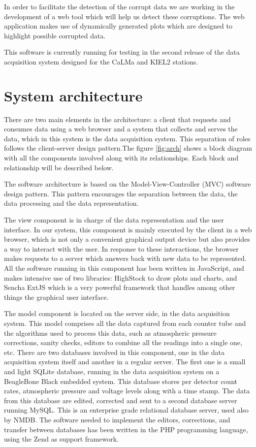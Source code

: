 \documentclass[a4paper]{jpconf}
\begin{document}
In order to facilitate the detection of the corrupt data we are working in the
development of a web tool which will help us detect these corruptions. The web
application makes use of dynamically generated plots which are designed to
highlight possible corrupted data.

This software is currently running for testing in the second release of the data
acquisition system\cite{Garcia2014} designed for the CaLMa\cite{Medina2013} and
KIEL2 stations.


\section{System architecture}

There are two main elements in the architecture: a client that requests and
consumes data using a web browser and a system that collects and serves the
data, which in this system is the data acquisition system. This separation of
roles follows the client-server design pattern\cite{wiki:ClientServer}.The
figure \ref{fig:arch} shows a block diagram with all the components involved
along with its relationships. Each block and relationship will be described
below.

The software architecture is based on the Model-View-Controller (MVC) software
design pattern\cite{wiki:MVC}. This pattern encourages the separation between
the data, the data processing and the data representation. 

The view component is in charge of the data representation and the user
interface. In our system, this component is mainly executed by the client in a
web browser, which is not only a convenient graphical output device but also
provides a way to interact with the user. In response to these interactions, the
browser makes requests to a server which answers back with new data to be
represented. All the software running in this component has been written in
JavaScript, and makes intensive use of two libraries:
HighStock\cite{web:highstock} to draw plots and charts, and Sencha
ExtJS\cite{web:extjs} which is a very powerful framework that handles among
other things the graphical user interface.

The model component is located on the server side, in the data acquisition
system. This model comprises all the data captured from each counter tube and
the algorithms used to process this data, such as atmospheric pressure
corrections, sanity checks, editors to combine all the readings into a single
one, etc. There are two databases involved in this component, one in the data
acquisition system itself and another in a regular server. The first one is a
small and light SQLite database, running in the data acquisition system on a
BeagleBone Black embedded system\cite{Garcia2014}. This database stores per
detector count rates, atmospheric pressure and voltage levels along with a time
stamp. The data from this database are edited, corrected and sent to a second
database server running MySQL\cite{web:mysql}. This is an enterprise grade
relational database server, used also by NMDB. The software needed to implement
the editors, corrections, and transfer between databases has been written in the PHP programming language, using the Zend\cite{web:zend} as support framework.
\end{document}

